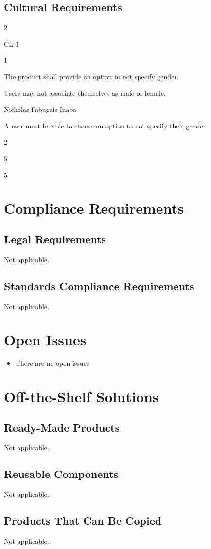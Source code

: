 \documentclass[12pt]{article}
\newenvironment{myreq}[1]{%
\setlist[description]{font=\normalfont\color{darkgray}}%
\begin{tcolorbox}[colframe=black,colback=white, sharp corners, boxrule=1pt]%
\bfseries\color{blue}%
\begin{description}#1}%
{\end{description}\end{tcolorbox}}
\newcommand{\twoinline}[2]{\begin{multicols}{2}#1 #2\end{multicols}}
\newcommand{\reqno}{\item[Requirement \#:]}
\newcommand{\reqevent}{\item[Event/BUC/PUC \#:]}
\newcommand{\reqdesc}{\item[Description:]}
\newcommand{\reqrat}{\item[Rationale:]}
\newcommand{\reqorig}{\item[Originator:]}
\newcommand{\reqfit}{\item[Fit Criterion:]}
\newcommand{\reqsatis}{\item[Customer Satisfaction:]}
\newcommand{\reqdissat}{\item[Customer Dissatisfaction:]}
\begin{document}
\subsection{Cultural Requirements}

\begin{myreq}
  \twoinline
    {\reqno CL-1}
    {\reqevent 1}
  \reqdesc The product shall provide an option to not specify gender.
  \reqrat Users may not associate themselves as male or female.
  \reqorig Nicholas Fabugais-Inaba
  \reqfit A user must be able to choose an option to not specify their
  gender.
  \twoinline
    {\reqsatis 5}
    {\reqdissat 5} 
\end{myreq}

\section{Compliance Requirements}
\subsection{Legal Requirements}
Not applicable.
\subsection{Standards Compliance Requirements}
Not applicable.

\section{Open Issues}

\begin{itemize}

  \item There are no open issues

\end{itemize}

\section{Off-the-Shelf Solutions}
\subsection{Ready-Made Products}
Not applicable.
\subsection{Reusable Components}
Not applicable.
\subsection{Products That Can Be Copied}
Not applicable.
\end{document}
